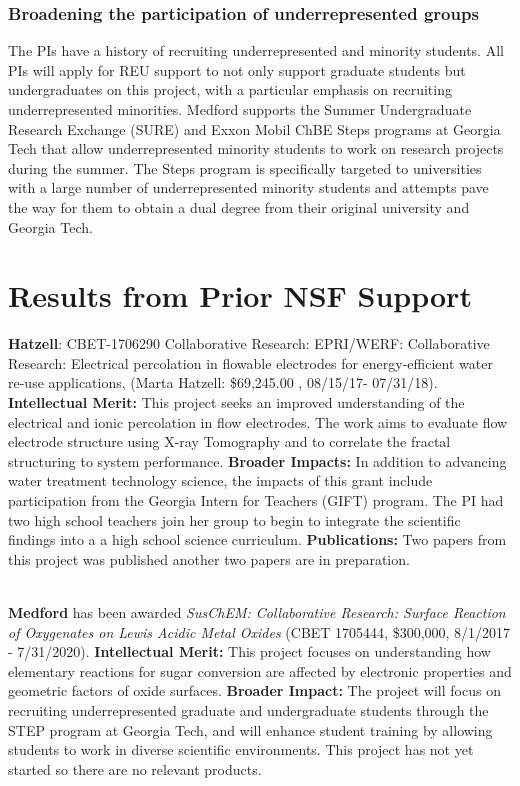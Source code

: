 \subsubsection*{\textbf{Broadening the participation of underrepresented groups}}
\vspace{2mm}

The PIs have a history of recruiting underrepresented and minority students. All PIs will apply for REU support to not only support graduate students but undergraduates on this project, with a particular emphasis on recruiting underrepresented minorities. Medford supports the Summer Undergraduate Research Exchange (SURE) and Exxon Mobil ChBE Steps programs at Georgia Tech that allow underrepresented minority students to work on research projects during the summer. The Steps program is specifically targeted to universities with a large number of underrepresented minority students and attempts pave the way for them to obtain a dual degree from their original university and Georgia Tech. 

\vspace{2mm}
\section{Results from Prior NSF Support}
\vspace{2mm}
\textbf{Hatzell}: CBET-1706290 Collaborative Research: EPRI/WERF: Collaborative Research: Electrical percolation in flowable electrodes for energy-efficient water re-use applications, (Marta Hatzell: \$69,245.00 , 08/15/17- 07/31/18). \textbf{Intellectual Merit:} This project seeks an improved understanding of the electrical and ionic percolation in flow electrodes. The work aims to evaluate flow electrode structure using X-ray Tomography and to correlate the fractal structuring to system performance. \textbf{Broader Impacts:} In addition to advancing water treatment technology science, the impacts of this grant include participation from the Georgia Intern for Teachers (GIFT) program. The PI had two high school teachers join her group to begin to integrate the scientific findings into a a high school science curriculum. \textbf{Publications:} Two papers from this project was published \cite{zhang2017combined,2017Hatzell}another two papers are in preparation.
\\ \noindent

\\ \noindent
\textbf{Medford} has been awarded \textit{SusChEM: Collaborative Research: Surface Reaction of Oxygenates on Lewis Acidic Metal Oxides} (CBET 1705444, \$300,000, 8/1/2017 - 7/31/2020). \textbf{Intellectual Merit:} This project focuses on understanding how elementary reactions for sugar conversion are affected by electronic properties and geometric factors of oxide surfaces. \textbf{Broader Impact:} The project will focus on recruiting underrepresented graduate and undergraduate students through the STEP program at Georgia Tech, and will enhance student training by allowing students to work in diverse scientific environments. This project has not yet started so there are no relevant products.